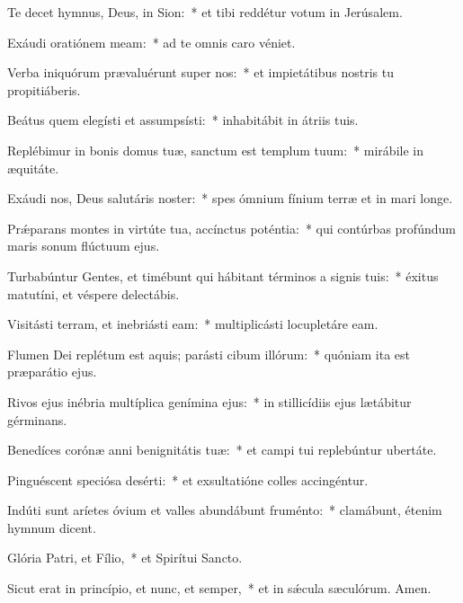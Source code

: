 \item Te decet hymnus, Deus, in Sion:~* et tibi reddétur votum in Jerúsalem.

\item Exáudi oratiónem meam:~* ad te omnis caro véniet.

\item Verba iniquórum prævaluérunt super nos:~* et impietátibus nostris tu propitiáberis.

\item Beátus quem elegísti et assumpsísti:~* inhabitábit in átriis tuis.

\item Replébimur in bonis domus tuæ, sanctum est templum tuum:~* mirábile in æquitáte.

\item Exáudi nos, Deus salutáris noster:~* spes ómnium fínium terræ et in mari longe.

\item Prǽparans montes in virtúte tua, accínctus poténtia:~* qui contúrbas profúndum maris sonum flúctuum ejus.

\item Turbabúntur Gentes, et timébunt qui hábitant términos a signis tuis:~* éxitus matutíni, et véspere delectábis.

\item Visitásti terram, et inebriásti eam:~* multiplicásti locupletáre eam.

\item Flumen Dei replétum est aquis; parásti cibum illórum:~* quóniam ita est præparátio ejus.

\item Rivos ejus inébria multíplica genímina ejus:~* in stillicídiis ejus lætábitur gérminans.

\item Benedíces corónæ anni benignitátis tuæ:~* et campi tui replebúntur ubertáte.

\item Pinguéscent speciósa desérti:~* et exsultatióne colles accingéntur.

\item Indúti sunt aríetes óvium et valles abundábunt fruménto:~* clamábunt, étenim hymnum dicent.

\item Glória Patri, et Fílio,~* et Spirítui Sancto.

\item Sicut erat in princípio, et nunc, et semper,~* et in sǽcula sæculórum. Amen.

